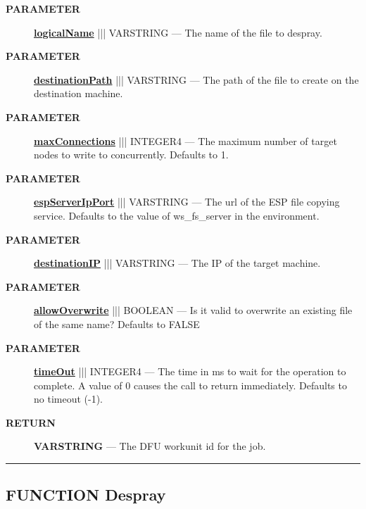 \par
\begin{description}
\item [\colorbox{tagtype}{\color{white} \textbf{\textsf{PARAMETER}}}] \textbf{\underline{logicalName}} ||| VARSTRING --- The name of the file to despray.
\item [\colorbox{tagtype}{\color{white} \textbf{\textsf{PARAMETER}}}] \textbf{\underline{destinationPath}} ||| VARSTRING --- The path of the file to create on the destination machine.
\item [\colorbox{tagtype}{\color{white} \textbf{\textsf{PARAMETER}}}] \textbf{\underline{maxConnections}} ||| INTEGER4 --- The maximum number of target nodes to write to concurrently. Defaults to 1.
\item [\colorbox{tagtype}{\color{white} \textbf{\textsf{PARAMETER}}}] \textbf{\underline{espServerIpPort}} ||| VARSTRING --- The url of the ESP file copying service. Defaults to the value of ws\_fs\_server in the environment.
\item [\colorbox{tagtype}{\color{white} \textbf{\textsf{PARAMETER}}}] \textbf{\underline{destinationIP}} ||| VARSTRING --- The IP of the target machine.
\item [\colorbox{tagtype}{\color{white} \textbf{\textsf{PARAMETER}}}] \textbf{\underline{allowOverwrite}} ||| BOOLEAN --- Is it valid to overwrite an existing file of the same name? Defaults to FALSE
\item [\colorbox{tagtype}{\color{white} \textbf{\textsf{PARAMETER}}}] \textbf{\underline{timeOut}} ||| INTEGER4 --- The time in ms to wait for the operation to complete. A value of 0 causes the call to return immediately. Defaults to no timeout (-1).
\end{description}







\par
\begin{description}
\item [\colorbox{tagtype}{\color{white} \textbf{\textsf{RETURN}}}] \textbf{VARSTRING} --- The DFU workunit id for the job.
\end{description}




\rule{\linewidth}{0.5pt}
\subsection*{\textsf{\colorbox{headtoc}{\color{white} FUNCTION}
Despray}}


